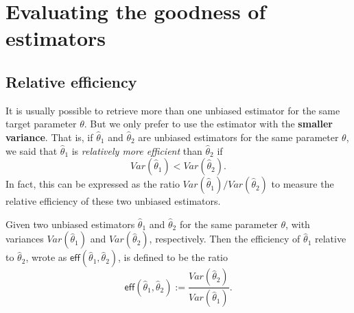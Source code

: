 \chapter{Evaluating the goodness of estimators}

\section{Relative efficiency}

It is usually possible to retrieve more than one unbiased estimator for the same target 
parameter $\theta$. But we only prefer to use the estimator with the 
\textbf{smaller variance}. That is, if $\widehat{\theta}_1$ and $\widehat{\theta}_2$ are 
unbiased estimators for the same parameter $\theta$, we said that 
$\widehat{\theta}_1$ is \textit{relatively more efficient} than $\widehat{\theta}_2$ 
if 
\[
    Var(\widehat{\theta}_1) < Var(\widehat{\theta}_2). 
\]
In fact, this can be expressed as the ratio $ Var(\widehat{\theta}_1) / Var(\widehat{\theta}_2)$
to measure the relative efficiency of these two unbiased estimators.

\begin{definition}
    Given two unbiased estimators $\widehat{\theta}_1$ and $\widehat{\theta}_2$ for the 
    same parameter $\theta$, with variances $Var(\widehat{\theta}_1)$ and $Var(\widehat{\theta}_2)$,
    respectively. Then the efficiency of $\widehat{\theta}_1$ relative to $\widehat{\theta}_2$, 
    wrote as $\textsf{eff}(\widehat{\theta}_1, \widehat{\theta}_2)$, is defined to be the ratio
    \begin{equation}
        \textsf{eff}(\widehat{\theta}_1, \widehat{\theta}_2) := \frac{Var(\widehat{\theta}_2)}{Var(\widehat{\theta}_1)}.
    \end{equation}
\end{definition}

